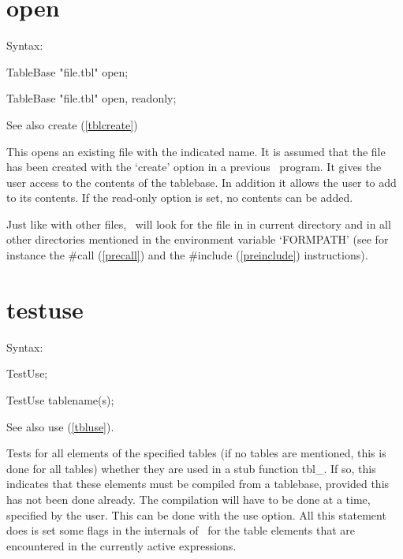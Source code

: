 
\section{open}
\label{tblopen}

\noindent Syntax:

TableBase "file.tbl" open;

TableBase "file.tbl" open, readonly;

\noindent See also create (\ref{tblcreate})

\noindent This opens an existing file with the indicated name. 
It is assumed that the file has been created with the 
`create' option in a previous \FORM\ program. It gives the user access to the 
contents of the tablebase. In addition it allows the user to add to its 
contents. If the read-only option is set, no contents can be added.

\noindent Just like with other files, \FORM\ will look for the file in in 
current directory and in all other directories mentioned in the environment 
variable `FORMPATH' (see for instance the 
\#call (\ref{precall}) and the \#include 
(\ref{preinclude}) instructions).


\section{testuse}
\label{tbltestuse}

\noindent Syntax:

TestUse;

TestUse tablename(s);

\noindent See also use (\ref{tbluse}).

\noindent Tests for all elements of the specified tables (if 
no tables are mentioned, this is done for all tables) whether they are used 
in a stub function tbl\_. If so, this indicates 
that these elements must be compiled from a tablebase, provided this has 
not been done already. The compilation will have to be done at a time, 
specified by the user. This can be done with the use option. All 
this statement does is set some flags in the internals of \FORM\ for the 
table elements that are encountered in the currently active expressions.


